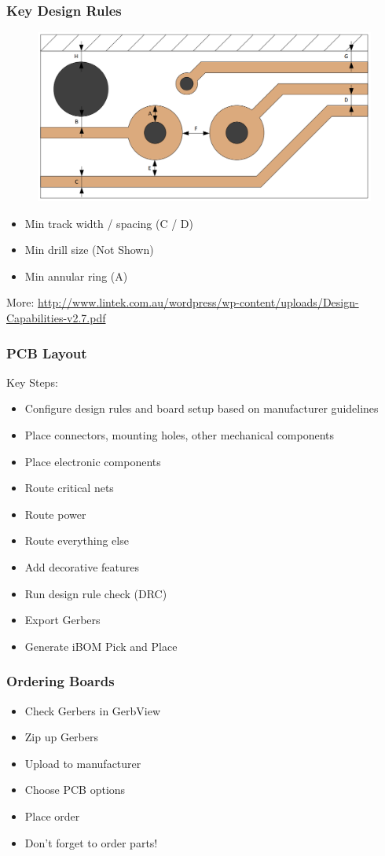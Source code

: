 \documentclass[t]{beamer}
\begin{document}
\begin{frame}
\frametitle{Key Design Rules}
\begin{figure}
	\includegraphics[width=0.7\linewidth]{lintekCu.png}
\end{figure}
\begin{itemize}
	\item Min track width / spacing (C / D)
	\item Min drill size (Not Shown)
	\item Min annular ring (A)
\end{itemize}
More: \url{http://www.lintek.com.au/wordpress/wp-content/uploads/Design-Capabilities-v2.7.pdf}
\end{frame}
\begin{frame}
\frametitle{PCB Layout}
Key Steps:
\begin{itemize}
	\item Configure design rules and board setup based on manufacturer guidelines
	\item Place connectors, mounting holes, other mechanical components 
	\item Place electronic components
	\item Route critical nets
	\item Route power
	\item Route everything else
	\item Add decorative features
	\item Run design rule check (DRC)
	\item Export Gerbers
	\item Generate iBOM Pick and Place 	
\end{itemize}
\end{frame}
\begin{frame}
\frametitle{Ordering Boards}
\begin{itemize}
	\item Check Gerbers in GerbView
	\item Zip up Gerbers
	\item Upload to manufacturer
	\item Choose PCB options
	\item Place order
	\item Don't forget to order parts!
\end{itemize}
\end{frame}
\end{document}

